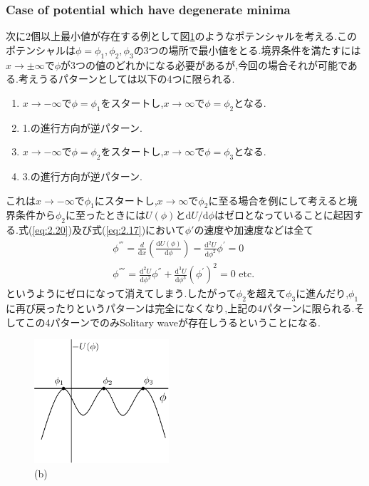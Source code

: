 \documentclass[dvipdfmx,11pt,a4paper]{jsbook}
\begin{document}
\subsubsection{Case of potential which have degenerate minima}
次に2個以上最小値が存在する例として図\ref{potential2}のようなポテンシャルを考える.このポテンシャルは$\phi=\phi_1,\phi_2,\phi_3$の3つの場所で最小値をとる.境界条件を満たすには$x\rightarrow \pm \infty$で$\phi$が3つの値のどれかになる必要があるが,今回の場合それが可能である.考えうるパターンとしては以下の4つに限られる.
\begin{enumerate}
    \item $x\rightarrow -\infty$で$\phi=\phi_1$をスタートし,$x\rightarrow \infty$で$\phi=\phi_2$となる.
    \item 1.の進行方向が逆パターン.
    \item $x\rightarrow -\infty$で$\phi=\phi_2$をスタートし,$x\rightarrow \infty$で$\phi=\phi_3$となる.
    \item 3.の進行方向が逆パターン.
\end{enumerate}
これは$x\rightarrow -\infty$で$\phi_1$にスタートし,$x\rightarrow \infty$で$\phi_2$に至る場合を例にして考えると境界条件から$\phi_2$に至ったときには$U(\phi)$と$\mathrm{d}U/\mathrm{d}\phi$はゼロとなっていることに起因する.式(\ref{eq:2.20})及び式(\ref{eq:2.17})において$\phi'$の速度や加速度などは全て
\begin{align}
    \phi^{'''}=\frac{d}{\mathrm{d} x}\left(\frac{\mathrm{d} U(\phi)}{\mathrm{d} \phi}\right)=\frac{\mathrm{d}^{2} U}{\mathrm{d} \phi^{2}} \phi^{'}=0\nonumber \\
    \phi^{''''}=\frac{\mathrm{d}^{2} U}{\mathrm{d} \phi^{2}} \phi^{''}+\frac{\mathrm{d}^{3} U}{\mathrm{d} \phi^{3}}\left(\phi^{'}\right)^{2}=0 \text { etc. }
\end{align}
というようにゼロになって消えてしまう.したがって$\phi_2$を超えて$\phi_3$に進んだり,$\phi_1$に再び戻ったりというパターンは完全になくなり,上記の4パターンに限られる.そしてこの4パターンでのみSolitary waveが存在しうるということになる.

\begin{figure}[H]
    \centering
    \includegraphics[width=5cm]{figure/potential2.png}
    \caption{(b)}
    \label{potential2}
\end{figure}
\end{document}
